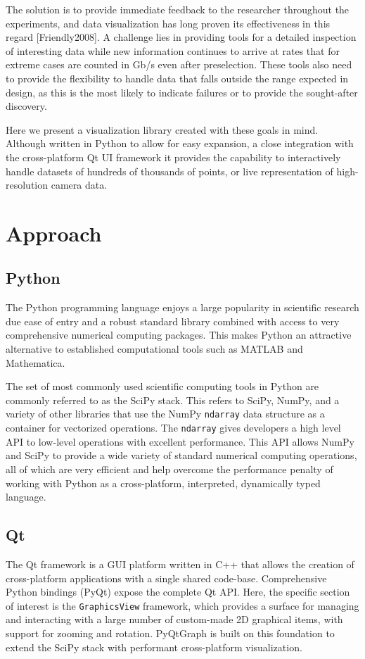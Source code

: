 \documentclass[journal]{vgtc}                %
\begin{document}
The solution is to provide immediate feedback to the researcher throughout the experiments, and data visualization has long proven its effectiveness in this regard [Friendly2008]. A challenge lies in providing tools for a detailed inspection of interesting data while new information continues to arrive at rates that for extreme cases are counted in Gb/s even after preselection\cite{LHC}. These tools also need to provide the flexibility to handle data that falls outside the range expected in design, as this is the most likely to indicate failures or to provide the sought-after discovery.

Here we present a visualization library created with these goals in mind. Although written in Python to allow for easy expansion, a close integration with the cross-platform Qt UI framework\cite{Qt} it provides the capability to interactively handle datasets of hundreds of thousands of points, or live representation of high-resolution camera data.


\section{Approach}
\subsection{Python}
The Python programming language enjoys a large popularity in scientific research due ease of entry and a robust standard library combined with access to very comprehensive numerical computing packages. This makes Python an attractive alternative to established computational tools such as MATLAB\cite{matlab} and Mathematica. %

The set of most commonly used scientific computing tools in Python are commonly referred to as the SciPy stack. %
This refers to SciPy, NumPy, and a variety of other libraries that use the NumPy \texttt{ndarray} data structure as a container for vectorized operations. The \texttt{ndarray} gives developers a high level API to low-level operations with excellent performance. This API allows NumPy and SciPy to provide a wide variety of standard numerical computing operations, all of which are very efficient and help overcome the performance penalty of working with Python as a cross-platform, interpreted, dynamically typed language.

\subsection{Qt}
The Qt framework is a GUI platform written in C++ that allows the creation of cross-platform applications with a single shared code-base. Comprehensive Python bindings (PyQt) expose the complete Qt API. Here, the specific section of interest is the \texttt{GraphicsView} framework, which provides a surface for managing and interacting with a large number of custom-made 2D graphical items, with support for zooming and rotation\cite{QtGraphicsView}. PyQtGraph is built on this foundation to extend the SciPy stack with performant cross-platform visualization.
\end{document}
